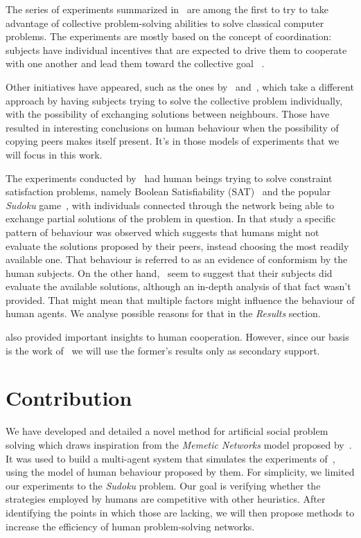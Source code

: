 \documentclass{article}
\begin{document}
The series of experiments summarized in~\cite{kearns:experim} are among the first to try to take advantage of collective problem-solving abilities to solve classical computer problems. The experiments are mostly based on the concept of coordination: subjects have individual incentives that are expected to drive them to cooperate with one another and lead them toward the collective goal ~\cite{nowak:evolutioncooperation}.

Other initiatives have appeared, such as the ones by~\cite{farenzena:collabem} and~\cite{mason:collablearnet}, which take a different approach by having subjects trying to solve the collective problem individually, with the possibility of exchanging solutions between neighbours. Those have resulted in interesting conclusions on human behaviour when the possibility of copying peers makes itself present. It's in those models of experiments that we will focus in this work.

The experiments conducted by~\cite{farenzena:collabem} had human beings trying to solve constraint satisfaction problems, namely Boolean Satisfiability (SAT)~\cite{cook:complexitytheoremproving} and the popular \emph{Sudoku} game~\cite{weber:satsudoku}, with individuals connected through the network being able to exchange partial solutions of the problem in question. In that study a specific pattern of behaviour was observed which suggests that humans might not evaluate the solutions proposed by their peers, instead choosing the most readily available one. That behaviour is referred to as an evidence of conformism by the human subjects. On the other hand,~\cite{mason:collablearnet} seem to suggest that their subjects did evaluate the available solutions, although an in-depth analysis of that fact wasn't provided. That might mean that multiple factors might influence the behaviour of human agents. We analyse possible reasons for that in the \emph{Results} section.

\cite{mason:collablearnet} also provided important insights to human cooperation. However, since our basis is the work of~\cite{farenzena:collabem} we will use the former's results only as secondary support.

\section{Contribution}

We have developed and detailed a novel method for artificial social problem solving which draws inspiration from the {\em Memetic Networks} model proposed by~\cite{araujo:memenet}. It was used to build a multi-agent system that simulates the experiments of~\cite{farenzena:collabem}, using the model of human behaviour proposed by them. For simplicity, we limited our experiments to the {\em Sudoku} problem. Our goal is verifying whether the strategies employed by humans are competitive with other heuristics. After identifying the points in which those are lacking, we will then propose methods to increase the efficiency of human problem-solving networks.
\end{document}
